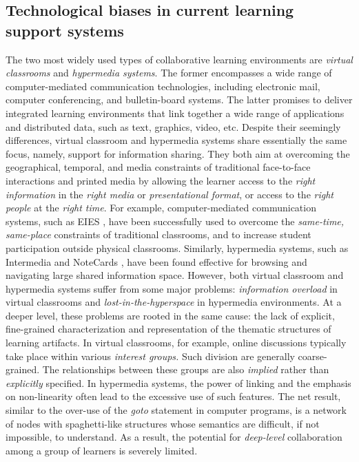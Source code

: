 \subsection{Technological biases in current learning support systems}

The two most widely used types of collaborative learning environments are
{\it virtual classrooms\/} and {\it hypermedia systems\/}. The former
encompasses a wide range of computer-mediated communication technologies,
including electronic mail, computer conferencing, and bulletin-board
systems. The latter promises to deliver integrated learning environments
that link together a wide range of applications and distributed data, such
as text, graphics, video, etc. Despite their seemingly differences, virtual
classroom and hypermedia systems share essentially the same focus, namely,
support for information sharing. They both aim at overcoming the
geographical, temporal, and media constraints of traditional face-to-face
interactions and printed media by allowing the learner access to the {\it
right information\/} in the {\it right media \/} or {\it presentational
format\/}, or access to the {\it right people\/} at the {\it right time\/}.
For example, computer-mediated communication systems, such as EIES
\cite{Hiltz88}, have been successfully used to overcome the {\it same-time,
same-place\/} constraints of traditional classrooms, and to increase
student participation outside physical classrooms.  Similarly, hypermedia
systems, such as Intermedia \cite{Yankelovich88} and NoteCards
\cite{Halasz87Notecards}, have been found effective for browsing and
navigating large shared information space.  However, both virtual classroom
and hypermedia systems suffer from some major problems: {\it information
overload\/} in virtual classrooms and {\it lost-in-the-hyperspace\/} in
hypermedia environments. At a deeper level, these problems are rooted in
the same cause: the lack of explicit, fine-grained characterization and
representation of the thematic structures of learning artifacts. In virtual
classrooms, for example, online discussions typically take place within
various {\it interest groups.\/} Such division are generally
coarse-grained. The relationships between these groups are also {\it
implied\/} rather than {\it explicitly\/} specified. In hypermedia systems,
the power of linking and the emphasis on non-linearity often lead to the
excessive use of such features. The net result, similar to the over-use of
the {\it goto\/} statement in computer programs, is a network of nodes with
spaghetti-like structures whose semantics are difficult, if not impossible,
to understand. As a result, the potential for {\it deep-level\/}
collaboration among a group of learners is severely limited.

